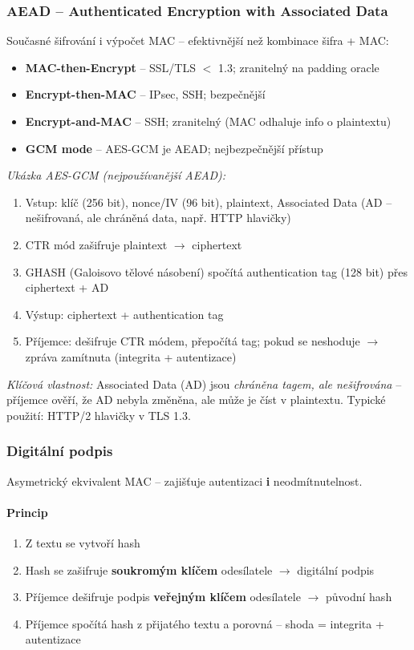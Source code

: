 \subsubsection{AEAD -- Authenticated Encryption with Associated Data}

Současné šifrování i výpočet MAC -- efektivnější než kombinace šifra + MAC:
\begin{itemize}
  \item \textbf{MAC-then-Encrypt} -- SSL/TLS $<$ 1.3; zranitelný na padding oracle
  \item \textbf{Encrypt-then-MAC} -- IPsec, SSH; bezpečnější
  \item \textbf{Encrypt-and-MAC} -- SSH; zranitelný (MAC odhaluje info o plaintextu)
  \item \textbf{GCM mode} -- AES-GCM je AEAD; nejbezpečnější přístup
\end{itemize}

\textit{Ukázka AES-GCM (nejpoužívanější AEAD):}
\begin{enumerate}
  \item Vstup: klíč (256 bit), nonce/IV (96 bit), plaintext, Associated Data (AD -- nešifrovaná, ale chráněná data, např. HTTP hlavičky)
  \item CTR mód zašifruje plaintext $\to$ ciphertext
  \item GHASH (Galoisovo tělové násobení) spočítá authentication tag (128 bit) přes ciphertext + AD
  \item Výstup: ciphertext + authentication tag
  \item Příjemce: dešifruje CTR módem, přepočítá tag; pokud se neshoduje $\to$ zpráva zamítnuta (integrita + autentizace)
\end{enumerate}
\textit{Klíčová vlastnost:} Associated Data (AD) jsou \textit{chráněna tagem, ale nešifrována} -- příjemce ověří, že AD nebyla změněna, ale může je číst v plaintextu. Typické použití: HTTP/2 hlavičky v TLS 1.3.

\subsubsection{Digitální podpis}

Asymetrický ekvivalent MAC -- zajišťuje autentizaci \textbf{i} neodmítnutelnost.

\paragraph{Princip}
\begin{enumerate}
  \item Z textu se vytvoří hash
  \item Hash se zašifruje \textbf{soukromým klíčem} odesílatele $\to$ digitální podpis
  \item Příjemce dešifruje podpis \textbf{veřejným klíčem} odesílatele $\to$ původní hash
  \item Příjemce spočítá hash z přijatého textu a porovná -- shoda = integrita + autentizace
\end{enumerate}

